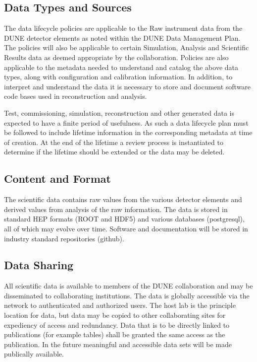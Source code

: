 \documentclass[../main-v1.tex]{subfiles}
\begin{document}
\subsection{
 Data Types and Sources}
The data lifecycle policies are applicable to the Raw instrument data from the DUNE detector elements as noted within the DUNE Data Management Plan.  The policies will also be applicable to certain Simulation, Analysis and Scientific Results data as deemed appropriate by the collaboration.  Policies are also applicable to the metadata needed to understand and catalog the above data types, along with configuration and calibration information.  In addition, to interpret and understand the data it is necessary to store and document software code bases used in reconstruction and analysis.

Test, commissioning, simulation, reconstruction and other generated data is expected to have a finite period of usefulness.  As such a data lifecycle plan must be followed to include lifetime information in the corresponding metadata at time of creation.  At the end of the lifetime a review process is instantiated to determine if the lifetime should be extended or the data may be deleted.

\subsection{ Content and Format}
The scientific data contains raw values from the various detector elements and derived values from analysis of the raw information.  The data is stored in standard HEP formats (ROOT and HDF5) and various databases (postgresql), all of which may evolve over time.  Software and documentation will be stored in industry standard repositories (github).

\subsection{ Data Sharing}
All scientific data is available to members of the DUNE collaboration and may be disseminated to collaborating institutions.  The data is globally accessible via the network to authenticated and authorized users.  The host lab is the principle location for data, but data may be copied to other collaborating sites for expediency of access and redundancy.
Data that is to be directly linked to publications (for example tables) shall be granted the same access as the publication.  In the future meaningful and accessible data sets will be made publically available.
\end{document}
